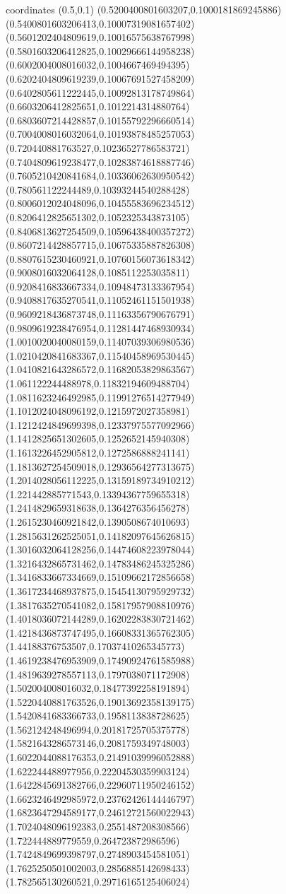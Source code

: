 coordinates {%
(0.5,0.1)
(0.5200400801603207,0.1000181869245886)
(0.5400801603206413,0.10007319081657402)
(0.5601202404809619,0.10016575638767998)
(0.5801603206412825,0.10029666144958238)
(0.6002004008016032,0.1004667469494395)
(0.6202404809619239,0.10067691527458209)
(0.6402805611222445,0.10092813178749864)
(0.6603206412825651,0.1012214314880764)
(0.6803607214428857,0.10155792296660514)
(0.7004008016032064,0.10193878485257053)
(0.720440881763527,0.10236527786583721)
(0.7404809619238477,0.10283874618887746)
(0.7605210420841684,0.10336062630950542)
(0.780561122244489,0.10393244540288428)
(0.8006012024048096,0.10455583696234512)
(0.8206412825651302,0.1052325343873105)
(0.8406813627254509,0.10596438400357272)
(0.8607214428857715,0.10675335887826308)
(0.8807615230460921,0.10760156073618342)
(0.9008016032064128,0.1085112253035811)
(0.9208416833667334,0.10948473133367954)
(0.9408817635270541,0.11052461151501938)
(0.9609218436873748,0.11163356790676791)
(0.9809619238476954,0.11281447468930934)
(1.0010020040080159,0.11407039306980536)
(1.0210420841683367,0.11540458969530445)
(1.0410821643286572,0.11682053829863567)
(1.061122244488978,0.11832194609488704)
(1.0811623246492985,0.11991276514277949)
(1.1012024048096192,0.1215972027358981)
(1.1212424849699398,0.12337975577092966)
(1.1412825651302605,0.1252652145940308)
(1.1613226452905812,0.1272586888241141)
(1.1813627254509018,0.12936564277313675)
(1.2014028056112225,0.13159189734910212)
(1.221442885771543,0.13394367759655318)
(1.2414829659318638,0.1364276356456278)
(1.2615230460921842,0.1390508674010693)
(1.2815631262525051,0.14182097645626815)
(1.3016032064128256,0.14474608223978044)
(1.3216432865731462,0.14783486245325286)
(1.3416833667334669,0.15109662172856658)
(1.3617234468937875,0.15454130795929732)
(1.3817635270541082,0.15817957908810976)
(1.4018036072144289,0.16202283830721462)
(1.4218436873747495,0.16608331365762305)
(1.44188376753507,0.17037410265345773)
(1.4619238476953909,0.17490924761585988)
(1.4819639278557113,0.1797038071172908)
(1.502004008016032,0.18477392258191894)
(1.5220440881763526,0.19013692358139175)
(1.5420841683366733,0.1958113838728625)
(1.562124248496994,0.20181725705375778)
(1.5821643286573146,0.2081759349748003)
(1.6022044088176353,0.21491039996052888)
(1.622244488977956,0.22204530359903124)
(1.6422845691382766,0.22960711950246152)
(1.6623246492985972,0.23762426144446797)
(1.6823647294589177,0.24612721560022943)
(1.7024048096192383,0.2551487208308566)
(1.722444889779559,0.264723872986596)
(1.7424849699398797,0.2748903454581051)
(1.7625250501002003,0.2856885142698433)
(1.782565130260521,0.29716165125406024)
}
